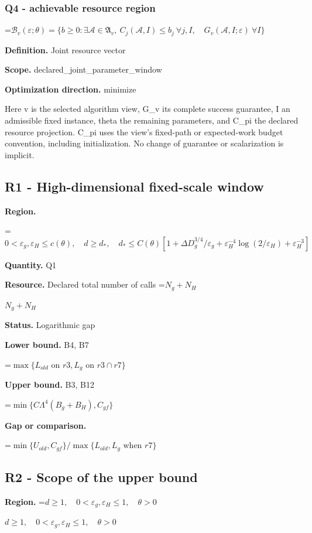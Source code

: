 \documentclass[10pt,a4paper]{article}
\newcommand{\AtlasMath}[1]{\par\begingroup\centering\setbox0=\hbox{$\displaystyle #1$}\ifdim\wd0>1.4\linewidth\typeout{ATLAS WIDE FORMULA: \the\wd0}\fi\ifdim\wd0>\linewidth\resizebox{\linewidth}{!}{\box0}\else\box0\fi\par\endgroup}
\newcommand{\AtlasInlineMath}[1]{\begingroup\setbox0=\hbox{$#1$}\ifdim\wd0>.4\linewidth\endgroup\AtlasMath{#1}\else\endgroup$#1$\fi}
\begin{document}
\subsubsection{Q4 - achievable resource region}
\AtlasMath{\mathcal B_v(\varepsilon;\theta)=\{b\ge0:\exists\mathcal A\in\mathfrak A_v,\ C_j(\mathcal A,I)\le b_j\ \forall j,I,\quad G_v(\mathcal A,I;\varepsilon)\ \forall I\}}
\textbf{Definition.} Joint resource vector

\textbf{Scope.} declared\_\allowbreak{}joint\_\allowbreak{}parameter\_\allowbreak{}window

\textbf{Optimization direction.} minimize

Here v is the selected algorithm view, G\_\allowbreak{}v its complete success guarantee, I an admissible fixed instance, theta the remaining parameters, and C\_\allowbreak{}pi the declared resource projection. C\_\allowbreak{}pi uses the view's fixed-path or expected-work budget convention, including initialization. No change of guarantee or scalarization is implicit.

\subsection{R1 - High-dimensional fixed-scale window}
\textbf{Region.} 
\AtlasMath{0<\varepsilon_g,\varepsilon_H\le c(\theta),\quad d\ge d_*,\quad d_*\le C(\theta)[1+\Delta D_g^{3/4}/\varepsilon_g+\varepsilon_H^{-4}\log(2/\varepsilon_H)+\varepsilon_H^{-3}]}


\textbf{Quantity.} Q1

\textbf{Resource.} Declared total number of calls \AtlasInlineMath{N_g+N_H}

\textbf{Status.} Logarithmic gap

\textbf{Lower bound.} B4, B7

\AtlasMath{\max\{L_{old}\text{ on }r3,L_g\text{ on }r3\cap r7\}}
\textbf{Upper bound.} B3, B12

\AtlasMath{\min\{C\Lambda^4(B_g+B_H),C_{gf}\}}
\textbf{Gap or comparison.}

\AtlasMath{\min\{U_{old},C_{gf}\}/\max\{L_{old},L_g\text{ when }r7\}}
\subsection{R2 - Scope of the upper bound}
\textbf{Region.} \AtlasInlineMath{d\ge1,\quad0<\varepsilon_g,\varepsilon_H\le1,\quad\theta>0}
\end{document}
